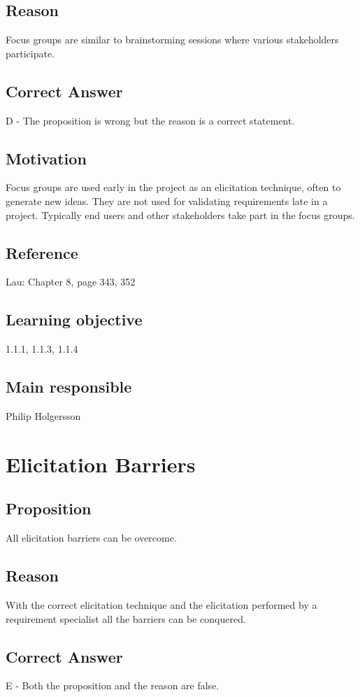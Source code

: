 \documentclass[a4paper]{article}
\begin{document}
\subsection*{Reason}
Focus groups are similar to brainstorming sessions where various stakeholders participate.
\subsection*{Correct Answer}
D - The proposition is wrong but the reason is a correct statement.
\subsection*{Motivation}
Focus groups are used early in the project as an elicitation technique, often to generate new ideas. They are not used for validating requirements late in a project. Typically end users and other stakeholders take part in the focus groups.
\subsection*{Reference}
Lau: Chapter 8, page 343, 352
\subsection*{Learning objective}
1.1.1, 1.1.3, 1.1.4
\subsection*{Main responsible}
Philip Holgersson


\section{Elicitation Barriers}
\subsection*{Proposition}
All elicitation barriers can be overcome.
\subsection*{Reason}
With the correct elicitation technique and the elicitation performed by a requirement specialist all the barriers can be conquered.
\subsection*{Correct Answer}
E - Both the proposition and the reason are false.
\end{document}
